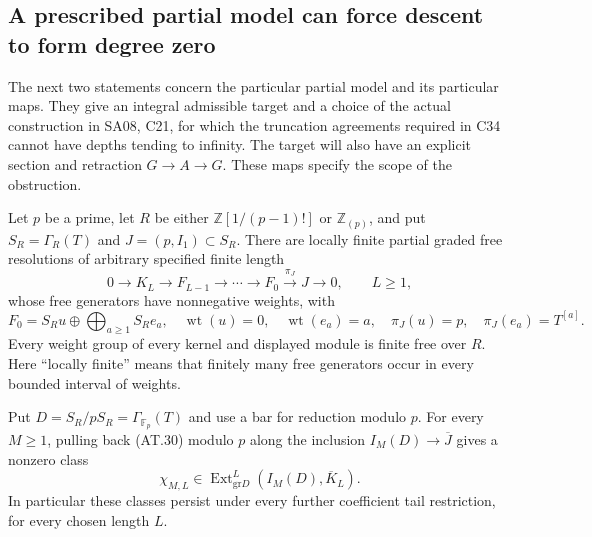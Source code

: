\subsection{A prescribed partial model can force descent to form degree zero}

The next two statements concern the particular partial model and its
particular maps.  They give an integral admissible target and a choice
of the actual construction in SA08, C21, for which the truncation
agreements required in C34 cannot have depths tending to infinity.
The target will also have an explicit section and retraction
$G\to A\to G$.  These maps specify the scope of the obstruction.

\begin{proposition}
\label{AT11}
Let $p$ be a prime, let $R$ be either
$\mathbb Z[1/(p-1)!]$ or $\mathbb Z_{(p)}$, and put
$S_R=\Gamma_R(T)$ and $J=(p,I_1)\subset S_R$.
There are locally finite partial graded free resolutions of arbitrary
specified finite length
\[
 0\longrightarrow K_L\longrightarrow F_{L-1}
 \longrightarrow\cdots\longrightarrow F_0
 \xrightarrow{\pi_J}J\longrightarrow0,\qquad L\geq1,
 \tag{AT.30}
\]
whose free generators have nonnegative weights, with
\[
 F_0=S_Ru\oplus\bigoplus_{a\geq1}S_Re_a,
 \quad \operatorname{wt}(u)=0,\quad\operatorname{wt}(e_a)=a,
 \quad \pi_J(u)=p,\quad\pi_J(e_a)=T^{[a]}.
 \tag{AT.31}
\]
Every weight group of every kernel and displayed module is
finite free over $R$.
Here ``locally finite'' means that finitely many free generators
occur in every bounded interval of weights.

Put $D=S_R/pS_R=\Gamma_{\mathbb F_p}(T)$ and use a bar for
reduction modulo $p$.  For every $M\geq1$, pulling back
\textup{(AT.30)} modulo $p$ along the inclusion
$I_M(D)\to\overline J$ gives a nonzero class
\[
 \chi_{M,L}\in
 \operatorname{Ext}^L_{\mathrm{gr}D}(I_M(D),\overline K_L).
 \tag{AT.32}
\]
In particular these classes persist under every further coefficient
tail restriction, for every chosen length $L$.
\end{proposition}

